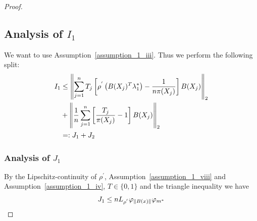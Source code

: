 \begin{proof}
\subsection*{Analysis of $I_1$}
We want to use Assumption~\ref{assumption_1_iii}.
Thus we perform the following split:
\begin{align}
  \label{ch_1_i1}
  \begin{split}
  I_1 
  &\le
    \left\lVert
      \sum_{j = 1}^{n} 
        T_j  
      \left[ 
        \rho^{'} 
        \left( 
          B(X_j)^T \lambda^*_1
        \right)
      -
      \frac{1}{n \pi(X_j)}
      \right]
      B(X_j)
    \right\rVert_2
  \\
  &+
    \left\lVert
      \frac{1}{n}
      \sum_{j = 1}^{n} 
      \left[ 
        \frac{T_j}{\pi(X_j)}
      -
      1
      \right]
      B(X_j)
    \right\rVert_2
    \\
  &=:
  J_1 + J_2
  \end{split}
\end{align}

\subsubsection*{Analysis of $J_1$}

By the Lipschitz-continuity of 
$\rho^{'}$,
Assumption~\ref{assumption_1_viii}
and
Assumption~\ref{assumption_1_iv},
$T \in \{0, 1\}$
and 
the triangle inequality 
we have
\begin{gather}
  \label{ch_1_j1_result}
  J_1 
  \le
  n L_{\rho^{'}}\varphi_{\left\lVert B(x)\right\rVert} \varphi_{m^*}
\end{gather}


\end{proof}
